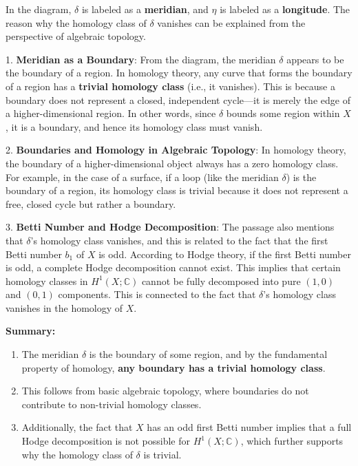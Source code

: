 \documentclass[lang=en,12pt]{beautybook}
\begin{document}
\begin{remark}
    \upshape
    In the diagram, $\delta$ is labeled as a \textbf{meridian}, and $\eta$ is labeled as a \textbf{longitude}. The reason why the homology class of $\delta$ vanishes can be explained from the perspective of algebraic topology.

1. \textbf{Meridian as a Boundary}:
   From the diagram, the meridian $\delta$ appears to be the boundary of a region. In homology theory, any curve that forms the boundary of a region has a \textbf{trivial homology class} (i.e., it vanishes). This is because a boundary does not represent a closed, independent cycle—it is merely the edge of a higher-dimensional region. In other words, since $\delta$ bounds some region within $X$, it is a boundary, and hence its homology class must vanish.

2. \textbf{Boundaries and Homology in Algebraic Topology}:
   In homology theory, the boundary of a higher-dimensional object always has a zero homology class. For example, in the case of a surface, if a loop (like the meridian $\delta$) is the boundary of a region, its homology class is trivial because it does not represent a free, closed cycle but rather a boundary.

3. \textbf{Betti Number and Hodge Decomposition}:
   The passage also mentions that $\delta$'s homology class vanishes, and this is related to the fact that the first Betti number $b_1$ of $X$ is odd. According to Hodge theory, if the first Betti number is odd, a complete Hodge decomposition cannot exist. This implies that certain homology classes in $H^1(X;\mathbb{C})$ cannot be fully decomposed into pure $(1,0)$ and $(0,1)$ components. This is connected to the fact that $\delta$'s homology class vanishes in the homology of $X$.

\textbf{Summary:}\begin{enumerate}
\item The meridian $\delta$ is the boundary of some region, and by the fundamental property of homology, \textbf{any boundary has a trivial homology class}.
\item This follows from basic algebraic topology, where boundaries do not contribute to non-trivial homology classes.
\item Additionally, the fact that $X$ has an odd first Betti number implies that a full Hodge decomposition is not possible for $H^1(X;\mathbb{C})$, which further supports why the homology class of $\delta$ is trivial.
\end{enumerate}
\end{remark}
\end{document}
